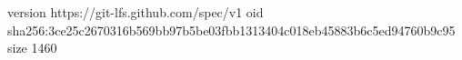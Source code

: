 version https://git-lfs.github.com/spec/v1
oid sha256:3ce25c2670316b569bb97b5be03fbb1313404c018eb45883b6c5ed94760b9c95
size 1460
